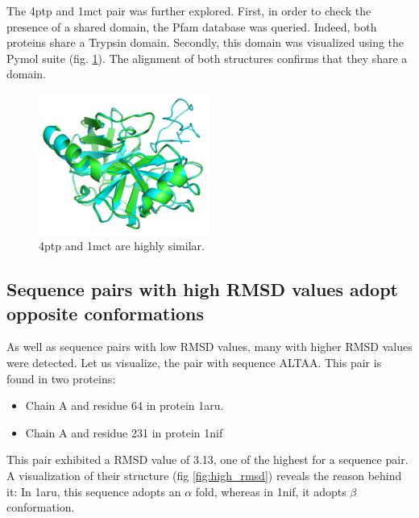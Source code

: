 \documentclass[a4paper, 11pt]{article} %
\begin{document}
The 4ptp and 1mct pair was further explored. First, in order to check the presence of a shared domain, the Pfam database 
was queried. Indeed, both proteins share a Trypsin domain. Secondly, this domain was visualized using the Pymol suite (fig. \ref{fig:perfect_match}). The alignment of both structures confirms that they share a domain.

\begin{figure}[!h]
\begin{center}
    \includegraphics[width = 0.5\textwidth]{../plots/perfect_match_white.png}
  \end{center}
  \label{fig:perfect_match}
  \caption{4ptp and 1mct are highly similar.}
\end{figure}

\subsection{Sequence pairs with high RMSD values adopt opposite conformations}

As well as sequence pairs with low RMSD values, many with higher RMSD values were detected. Let us visualize, the pair with sequence ALTAA. This pair is found in two proteins:

\begin{itemize}

\item Chain A and residue 64 in protein 1aru.

\item Chain A and residue 231 in protein 1nif

\end{itemize} 

This pair exhibited a RMSD value of 3.13, one of the highest for a sequence pair. A visualization of their structure (fig \ref{fig:high_rmsd}) reveals the reason behind it: In 1aru, this sequence adopts an $\alpha$ fold, whereas in 1nif, it adopts $\beta$ conformation.
\end{document}
